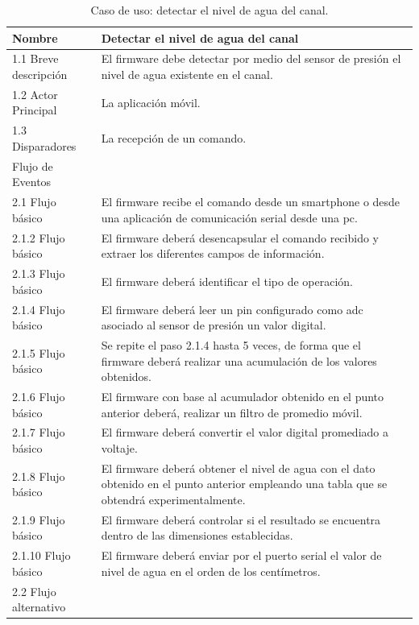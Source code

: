 \begin{table}[H]
\begin{center}
\caption{ Caso de uso: detectar el nivel de agua del canal.}
\begin{tabular}{ | m{4cm} | m{9.5cm} | }
\hline Nombre & Detectar el nivel de agua del canal \\ \hline
1.1 Breve descripción & 
El firmware debe detectar por medio del sensor de presión el nivel de agua existente en el canal. \\ \hline

 1.2 Actor Principal&La aplicación móvil.\\ \hline


 1.3 Disparadores & La recepción de un comando. \\ \hline

Flujo de Eventos& \\ \hline

 2.1 Flujo básico &
El firmware recibe el comando desde un smartphone  o desde una aplicación de comunicación serial desde una pc. \\ \hline


 2.1.2 Flujo básico &
El firmware deberá desencapsular el comando recibido y extraer los diferentes campos de información. \\ \hline

 2.1.3 Flujo básico &
El firmware deberá identificar el tipo de operación. \\ \hline


 2.1.4 Flujo básico &
El firmware deberá leer un pin configurado como adc asociado al sensor de presión un valor digital. \\ \hline
 

2.1.5 Flujo básico &
Se repite el paso 2.1.4 hasta 5 veces, de forma que el firmware deberá realizar una acumulación de los valores obtenidos. \\ \hline


2.1.6 Flujo básico &
 El firmware con base al acumulador obtenido en el punto anterior deberá, realizar un filtro de promedio móvil.  \\ \hline
 
2.1.7 Flujo básico &
El firmware deberá convertir el valor digital promediado a voltaje. \\ \hline 
2.1.8 Flujo básico &
El firmware deberá obtener el nivel de agua con el dato obtenido en el punto anterior empleando una tabla que se obtendrá experimentalmente. \\ \hline
2.1.9 Flujo básico &
El firmware deberá controlar si el resultado se encuentra dentro de las dimensiones establecidas. \\ \hline
2.1.10 Flujo básico &
El firmware deberá enviar por el puerto serial el valor de nivel de agua en el orden de los centímetros. \\ \hline
2.2 Flujo alternativo &  \\ \hline



\end{tabular}
\end{center}
\end{table}
